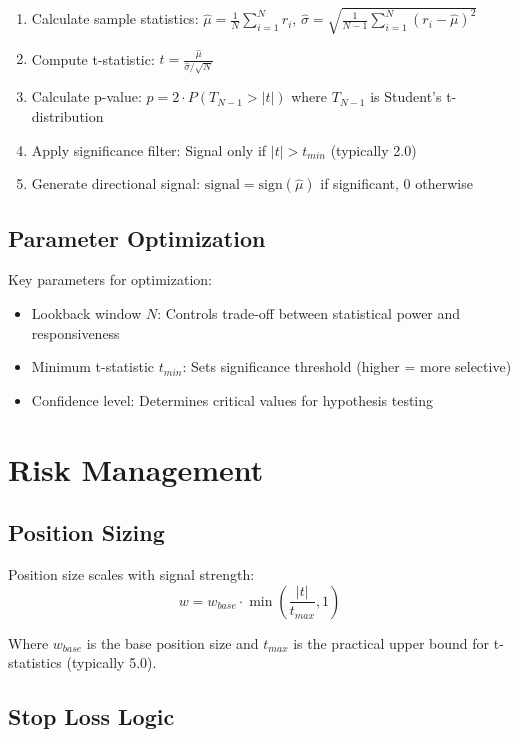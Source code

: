 \documentclass{article}
\begin{document}
\begin{enumerate}
\item Calculate sample statistics: $\hat{\mu} = \frac{1}{N}\sum_{i=1}^{N} r_i$, $\hat{\sigma} = \sqrt{\frac{1}{N-1}\sum_{i=1}^{N} (r_i - \hat{\mu})^2}$
\item Compute t-statistic: $t = \frac{\hat{\mu}}{\hat{\sigma}/\sqrt{N}}$
\item Calculate p-value: $p = 2 \cdot P(T_{N-1} > |t|)$ where $T_{N-1}$ is Student's t-distribution
\item Apply significance filter: Signal only if $|t| > t_{min}$ (typically 2.0)
\item Generate directional signal: $\text{signal} = \text{sign}(\hat{\mu})$ if significant, 0 otherwise
\end{enumerate}

\subsection{Parameter Optimization}

Key parameters for optimization:
\begin{itemize}
\item Lookback window $N$: Controls trade-off between statistical power and responsiveness
\item Minimum t-statistic $t_{min}$: Sets significance threshold (higher = more selective)
\item Confidence level: Determines critical values for hypothesis testing
\end{itemize}

\section{Risk Management}

\subsection{Position Sizing}

Position size scales with signal strength:
\begin{equation}
w = w_{base} \cdot \min\left(\frac{|t|}{t_{max}}, 1\right)
\end{equation}

Where $w_{base}$ is the base position size and $t_{max}$ is the practical upper bound for t-statistics (typically 5.0).

\subsection{Stop Loss Logic}
\end{document}
